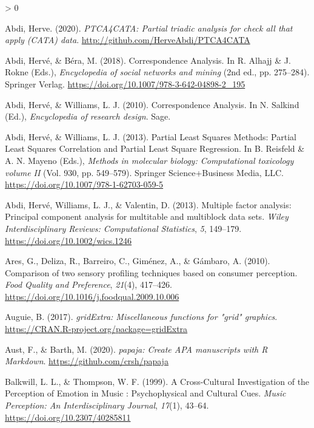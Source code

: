 \documentclass[
  english,
  man]{apa6}
\newlength{\cslhangindent}
\newenvironment{CSLReferences}[2] %
 {%
  \setlength{\parindent}{0pt}
  \ifodd #1 \everypar{\setlength{\hangindent}{\cslhangindent}}\ignorespaces\fi
  \ifnum #2 > 0
  \setlength{\parskip}{#2\baselineskip}
  \fi
 }%
 {}
\begin{document}
\hypertarget{refs}{}
\begin{CSLReferences}{1}{0}
\leavevmode\hypertarget{ref-R-PTCA4CATA}{}%
Abdi, Herve. (2020). \emph{PTCA4CATA: Partial triadic analysis for check all that apply (CATA) data}. \url{http://github.com/HerveAbdi/PTCA4CATA}

\leavevmode\hypertarget{ref-Abdi2018b}{}%
Abdi, Hervé, \& Béra, M. (2018). {Correspondence Analysis}. In R. Alhajj \& J. Rokne (Eds.), \emph{Encyclopedia of social networks and mining} (2nd ed., pp. 275--284). Springer Verlag. \url{https://doi.org/10.1007/978-3-642-04898-2_195}

\leavevmode\hypertarget{ref-Abdi2010d}{}%
Abdi, Hervé, \& Williams, L. J. (2010). {Correspondence Analysis}. In N. Salkind (Ed.), \emph{Encyclopedia of research design}. Sage.

\leavevmode\hypertarget{ref-Abdi2013a}{}%
Abdi, Hervé, \& Williams, L. J. (2013). {Partial Least Squares Methods: Partial Least Squares Correlation and Partial Least Square Regression}. In B. Reisfeld \& A. N. Mayeno (Eds.), \emph{Methods in molecular biology: Computational toxicology volume II} (Vol. 930, pp. 549--579). Springer Science+Business Media, LLC. \url{https://doi.org/10.1007/978-1-62703-059-5}

\leavevmode\hypertarget{ref-Abdi2013}{}%
Abdi, Hervé, Williams, L. J., \& Valentin, D. (2013). {Multiple factor analysis: Principal component analysis for multitable and multiblock data sets}. \emph{Wiley Interdisciplinary Reviews: Computational Statistics}, \emph{5}, 149--179. \url{https://doi.org/10.1002/wics.1246}

\leavevmode\hypertarget{ref-Ares2010}{}%
Ares, G., Deliza, R., Barreiro, C., Giménez, A., \& Gámbaro, A. (2010). {Comparison of two sensory profiling techniques based on consumer perception}. \emph{Food Quality and Preference}, \emph{21}(4), 417--426. \url{https://doi.org/10.1016/j.foodqual.2009.10.006}

\leavevmode\hypertarget{ref-R-gridExtra}{}%
Auguie, B. (2017). \emph{gridExtra: Miscellaneous functions for "grid" graphics}. \url{https://CRAN.R-project.org/package=gridExtra}

\leavevmode\hypertarget{ref-R-papaja}{}%
Aust, F., \& Barth, M. (2020). \emph{{papaja}: {Create} {APA} manuscripts with {R Markdown}}. \url{https://github.com/crsh/papaja}

\leavevmode\hypertarget{ref-Balkwill1999}{}%
Balkwill, L. L., \& Thompson, W. F. (1999). {A Cross-Cultural Investigation of the Perception of Emotion in Music : Psychophysical and Cultural Cues}. \emph{Music Perception: An Interdisciplinary Journal}, \emph{17}(1), 43--64. \url{https://doi.org/10.2307/40285811}


\end{CSLReferences}
\end{document}
